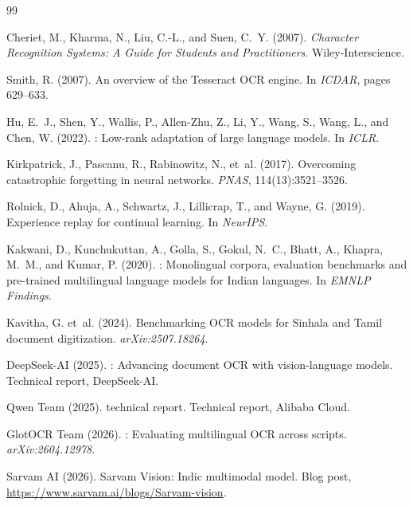 \documentclass[11pt,a4paper]{article}
\begin{document}
\begin{thebibliography}{99}

Cheriet, M., Kharma, N., Liu, C.-L., and Suen, C.~Y. (2007).
\newblock \emph{Character Recognition Systems: A Guide for Students and
  Practitioners}.
\newblock Wiley-Interscience.

Smith, R. (2007).
\newblock An overview of the {Tesseract} {OCR} engine.
\newblock In \emph{ICDAR}, pages 629--633.

Hu, E.~J., Shen, Y., Wallis, P., Allen-Zhu, Z., Li, Y., Wang, S.,
Wang, L., and Chen, W. (2022).
: Low-rank adaptation of large language models.
\newblock In \emph{ICLR}.

Kirkpatrick, J., Pascanu, R., Rabinowitz, N., et~al. (2017).
\newblock Overcoming catastrophic forgetting in neural networks.
\newblock \emph{PNAS}, 114(13):3521--3526.

Rolnick, D., Ahuja, A., Schwartz, J., Lillicrap, T., and Wayne, G. (2019).
\newblock Experience replay for continual learning.
\newblock In \emph{NeurIPS}.

Kakwani, D., Kunchukuttan, A., Golla, S., Gokul, N.~C., Bhatt, A.,
Khapra, M.~M., and Kumar, P. (2020).
: Monolingual corpora, evaluation benchmarks and
  pre-trained multilingual language models for {Indian} languages.
\newblock In \emph{EMNLP Findings}.

Kavitha, G. et~al. (2024).
\newblock Benchmarking {OCR} models for {Sinhala} and {Tamil} document
  digitization.
\newblock \emph{arXiv:2507.18264}.

DeepSeek-AI (2025).
: Advancing document {OCR} with vision-language
  models.
\newblock Technical report, DeepSeek-AI.

Qwen Team (2025).
 technical report.
\newblock Technical report, Alibaba Cloud.

GlotOCR Team (2026).
: Evaluating multilingual {OCR} across scripts.
\newblock \emph{arXiv:2604.12978}.

Sarvam AI (2026).
\newblock Sarvam Vision: Indic multimodal model.
\newblock Blog post, \url{https://www.sarvam.ai/blogs/Sarvam-vision}.

\end{thebibliography}
\end{document}

